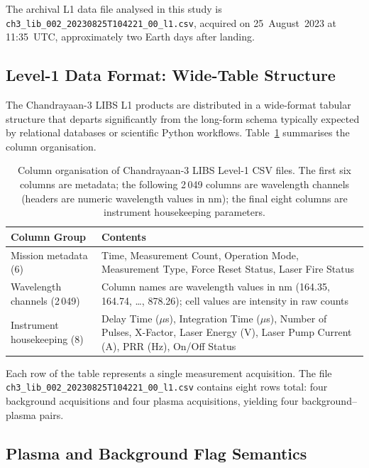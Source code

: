 \documentclass[a4paper,twocolumn,10pt]{article}
\begin{document}
The archival L1 data file analysed in this study is
\texttt{ch3\_lib\_002\_20230825T104221\_00\_l1.csv}, acquired on
25~August~2023 at 11:35~UTC, approximately two Earth days after
landing.

\subsection{Level-1 Data Format: Wide-Table Structure}

The Chandrayaan-3 LIBS L1 products are distributed in a wide-format
tabular structure that departs significantly from the long-form schema
typically expected by relational databases or scientific Python
workflows.  Table~\ref{tab:l1_schema} summarises the column
organisation.

\begin{table}[htbp]
\centering
\caption{Column organisation of Chandrayaan-3 LIBS Level-1 CSV files.
  The first six columns are metadata; the following 2\,049 columns are
  wavelength channels (headers are numeric wavelength values in nm);
  the final eight columns are instrument housekeeping parameters.}
\label{tab:l1_schema}
\begin{tabularx}{\columnwidth}{lX}
\toprule
\textbf{Column Group} & \textbf{Contents} \\
\midrule
Mission metadata (6) & Time, Measurement Count, Operation Mode,
  Measurement Type, Force Reset Status, Laser Fire Status \\
\midrule
Wavelength channels (2\,049) & Column names are wavelength values
  in nm (164.35, 164.74, \ldots, 878.26); cell values are intensity
  in raw counts \\
\midrule
Instrument housekeeping (8) & Delay Time ($\mu$s), Integration Time
  ($\mu$s), Number of Pulses, X-Factor, Laser Energy (V), Laser Pump
  Current (A), PRR (Hz), On/Off Status \\
\bottomrule
\end{tabularx}
\end{table}

Each row of the table represents a single measurement acquisition.
The file \texttt{ch3\_lib\_002\_20230825T104221\_00\_l1.csv} contains
eight rows total: four background acquisitions and four plasma
acquisitions, yielding four background--plasma pairs.

\subsection{Plasma and Background Flag Semantics}
\end{document}
